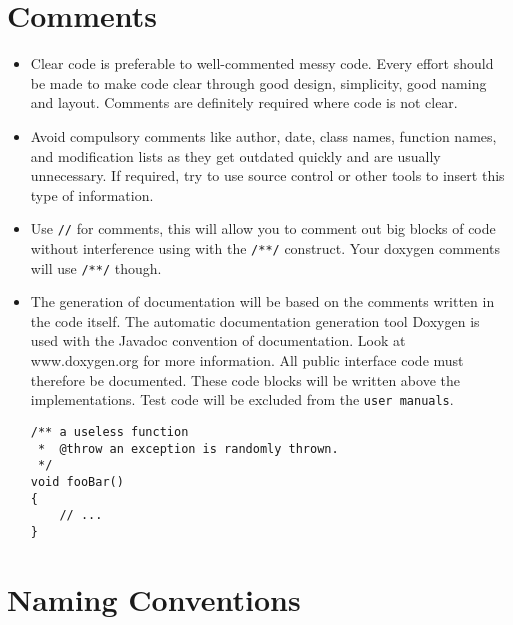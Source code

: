 \documentclass[10pt,a4paper,titlepage,dutch]{report}
\begin{document}

\chapter{Comments}

\begin{itemize}

\item Clear code is preferable to well-commented messy code. Every
effort should be made to make code clear through good design,
simplicity, good naming and layout. Comments are definitely
required where code is not clear.

\item Avoid compulsory comments like author, date, class names, function
names, and modification lists as they get outdated quickly and are
usually unnecessary. If required, try to use source control or
other tools to insert this type of information.

\item Use \verb|//| for comments, this will allow you to comment out big
blocks of code without interference using with the \verb|/**/|
construct.  Your doxygen comments will use \verb|/**/| though.

\item The generation of documentation will be based on the comments
written in the code itself. The automatic documentation generation
tool Doxygen is used with the Javadoc convention of documentation.
Look at www.doxygen.org for more information.  All public
interface code must therefore be documented.  These code blocks will be
written above the implementations.  Test code will be
excluded from the \verb|user manuals|.

\verb|/** a useless function|\\
\verb| *  @throw an exception is randomly thrown.|\\
\verb| */|\\
\verb|void fooBar()|\\
\verb|{|\\
\verb|    // ...|\\
\verb|}|

\end{itemize}


\chapter{Naming Conventions}
\end{document}
